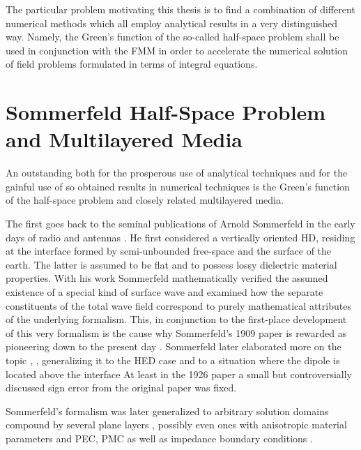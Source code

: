 The particular problem motivating this thesis is to find a combination of
different numerical methods which all employ analytical results in a very
distinguished way. Namely, the Green's function of the so-called half-space
problem shall be used in conjunction with the \ac{FMM} in order to accelerate
the numerical solution of field problems formulated in terms of integral
equations.

\section{Sommerfeld Half-Space Problem and Multilayered Media}

An outstanding both for the prosperous use of analytical techniques and for the
gainful use of so obtained results in numerical techniques is the Green's 
function of the half-space problem and closely related multilayered media.

The first goes back to the seminal publications of Arnold Sommerfeld in the
early days of radio and antennas \cite{Sommerfeld1909}.
He first considered a vertically oriented \ac{HD}, residing at the interface
formed by semi-unbounded free-space and the surface of the earth.
The latter is assumed to be flat and to possess lossy dielectric material
properties.
With his work Sommerfeld mathematically verified the assumed existence of
a special kind of surface wave \cite{Zenneck1907} and examined how the separate
constituents of the total wave field correspond to purely mathematical
attributes of the underlying formalism.
This, in conjunction to the first-place development of this very formalism is
the cause why Sommerfeld's 1909 paper is rewarded as pioneering down to the
present day \cite{Michalski2015, Michalski2016b, Mosig2021}.
Sommerfeld later elaborated more on the topic
\cite{Sommerfeld1926,Sommerfeld1964}, \eg, generalizing it to the \ac{HED}
case and to a situation where the dipole is located above the interface
At least in the 1926 paper \cite{Sommerfeld1926} a small but controversially
discussed sign error from the original paper \cite{Wait1998} was fixed.

Sommerfeld's formalism was later generalized to arbitrary solution domains
compound by several plane layers \cite{Felsen1994, Michalski1990},
possibly even ones with anisotropic material parameters and \ac{PEC}, \ac{PMC}
as well as impedance boundary conditions \cite{Hsu1993, Michalski2005}.


